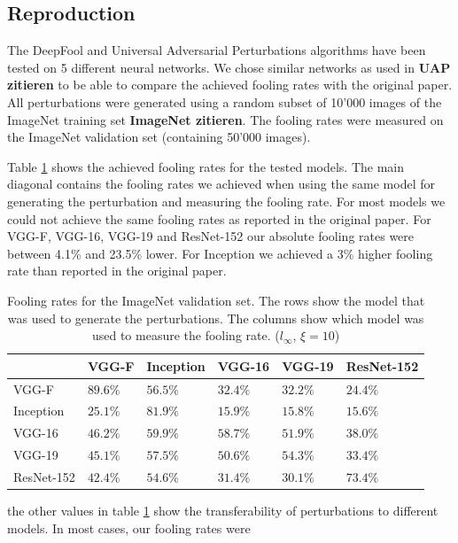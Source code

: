 \documentclass[runningheads]{llncs}
\begin{document}
\subsection{Reproduction}

The DeepFool and Universal Adversarial Perturbations algorithms have been tested on 5 different neural networks. We chose similar networks as used in {\bf UAP zitieren} to be able to compare the achieved fooling rates with the original paper. All perturbations were generated using a random subset of 10'000 images of the ImageNet training set {\bf ImageNet zitieren}. The fooling rates were measured on the ImageNet validation set (containing 50'000 images).

Table \ref{tbl_stoerraten_reprod_kreuz_linf} shows the achieved fooling rates for the tested models. The main diagonal contains the fooling rates we achieved when using the same model for generating the perturbation and measuring the fooling rate. For most models we could not achieve the same fooling rates as reported in the original paper. For VGG-F, VGG-16, VGG-19 and ResNet-152 our absolute fooling rates were between 4.1\% and 23.5\% lower. For Inception we achieved a 3\% higher fooling rate than reported in the original paper.

\begin{table}[]
\centering
\caption{Fooling rates for the ImageNet validation set. The rows show the model that was used to generate the perturbations. The columns show which model was used to measure the fooling rate. ($l_\infty$, $\xi=10$)}
\begin{tabular}{|l|l|l|l|l|l|}
\hline

			& VGG-F		&	Inception	&	VGG-16		&	VGG-19		&	ResNet-152	\\ \hline
VGG-F		& $89.6\%$	&	$56.5\%$		&	$32.4\%$		&	$32.2\%$		& 	$24.4\%$		\\
Inception	& $25.1\%$	&	$81.9\%$		&	$15.9\%$		&	$15.8\%$		& 	$15.6\%$	\\
VGG-16		& $46.2\%$	&	$59.9\%$		&	$58.7\%$		&	$51.9\%$		& 	$38.0\%$	\\
VGG-19		& $45.1\%$	&	$57.5\%$		&	$50.6\%$		&	$54.3\%$		& 	$33.4\%$	\\
ResNet-152	& $42.4\%$	&	$54.6\%$		&	$31.4\%$		&	$30.1\%$		& 	$73.4\%$	\\
\hline 
\end{tabular}
\label{tbl_stoerraten_reprod_kreuz_linf}
\end{table}

the other values in table \ref{tbl_stoerraten_reprod_kreuz_linf} show the transferability of perturbations to different models. In most cases, our fooling rates were 
	
\end{document}
